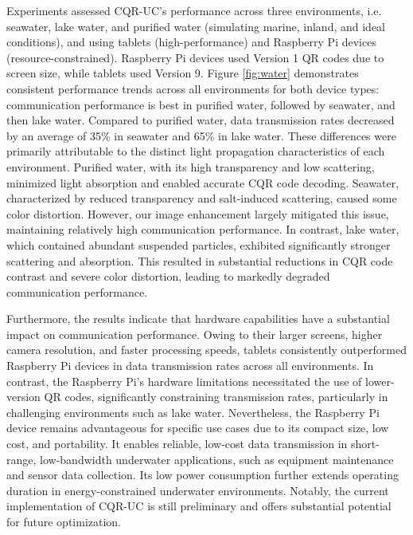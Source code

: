 \documentclass[preprint,12pt]{elsarticle}
\begin{document}
Experiments assessed CQR-UC's performance across three environments, i.e. seawater, lake water, and purified water (simulating marine, inland, and ideal conditions), and using tablets (high-performance) and Raspberry Pi devices (resource-constrained). Raspberry Pi devices used Version 1 QR codes due to screen size, while tablets used Version 9. 
Figure \ref{fig:water} demonstrates consistent performance trends across all environments for both device types: communication performance is best in purified water, followed by seawater, and then lake water. 
Compared to purified water, data transmission rates decreased by an average of 35\% in seawater and 65\% in lake water. 
These differences were primarily attributable to the distinct light propagation characteristics of each environment. Purified water, with its high transparency and low scattering, minimized light absorption and enabled accurate CQR code decoding. Seawater, characterized by reduced transparency and salt-induced scattering, caused some color distortion. However, our image enhancement largely mitigated this issue, maintaining relatively high communication performance. In contrast, lake water, which contained abundant suspended particles, exhibited significantly stronger scattering and absorption. This resulted in substantial reductions in CQR code contrast and severe color distortion, leading to markedly degraded communication performance.


Furthermore, the results indicate that hardware capabilities have a substantial impact on communication performance. Owing to their larger screens, higher camera resolution, and faster processing speeds, tablets consistently outperformed Raspberry Pi devices in data transmission rates across all environments. In contrast, the Raspberry Pi's hardware limitations necessitated the use of lower-version QR codes, significantly constraining transmission rates, particularly in challenging environments such as lake water. Nevertheless, the Raspberry Pi device remains advantageous for specific use cases due to its compact size, low cost, and portability.  It enables reliable, low-cost data transmission in short-range, low-bandwidth underwater applications, such as equipment maintenance and sensor data collection. Its low power consumption further extends operating duration in energy-constrained underwater environments. Notably, the current implementation of CQR-UC is still preliminary and offers substantial potential for future optimization.
\end{document}
